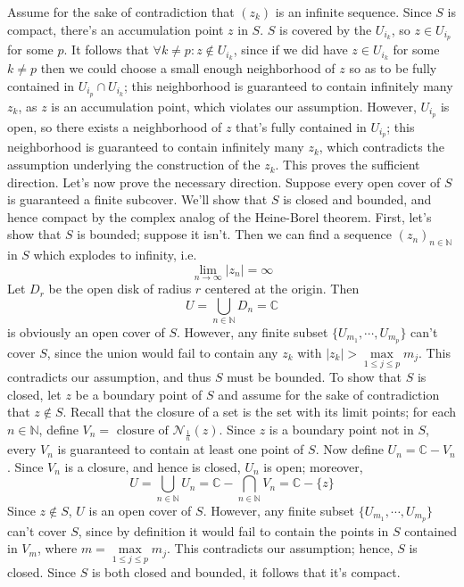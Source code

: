 \documentclass{article}
\newcommand*{\n}{\newline}
\newcommand*{\N}{\mathbb{N}}
\newcommand*{\C}{\mathbb{C}}
\begin{document}
\n
\indent Assume for the sake of contradiction that $ (z_k) $ is an infinite sequence. Since $ S $ is compact, there's an accumulation point $ z $ in $ S $. $ S $ is covered by the $ U_{i_k} $, so $ z \in U_{i_p} $ for some $ p $. It follows that $ \forall k \neq p: z \not \in U_{i_k} $, since if we did have $ z \in U_{i_k} $ for some $ k \neq p $ then we could choose a small enough neighborhood of $ z $ so as to be fully contained in $ U_{i_p} \cap U_{i_k} $; this neighborhood is guaranteed to contain infinitely many $ z_k $, as $ z $ is an accumulation point, which violates our assumption. However, $ U_{i_p} $ is open, so there exists a neighborhood of $ z $ that's fully contained in $ U_{i_p} $; this neighborhood is guaranteed to contain infinitely many $ z_k $, which contradicts the assumption underlying the construction of the $ z_k $. This proves the sufficient direction.
\n
\indent Let's now prove the necessary direction. Suppose every open cover of $ S $ is guaranteed a finite subcover. We'll show that $ S $ is closed and bounded, and hence compact by the complex analog of the Heine-Borel theorem. First, let's show that $ S $ is bounded; suppose it isn't. Then we can find a sequence $ ( z_n )_{n \in \N} $ in $ S $ which explodes to infinity, i.e.
$$ \lim_{n \to \infty} | z_n | = \infty $$
Let $ D_r $ be the open disk of radius $ r $ centered at the origin. Then
$$ U = \bigcup_{n \in \N} D_n = \C $$
is obviously an open cover of $ S $. However, any finite subset $ \{ U_{m_1}, \cdots, U_{m_p} \} $ can't cover $ S $, since the union would fail to contain any $ z_k $ with $ | z_k | > \max \limits_{1 \leq j \leq p} m_j $. This contradicts our assumption, and thus $ S $ must be bounded.
\n
To show that $ S $ is closed, let $ z $ be a boundary point of $ S $ and assume for the sake of contradiction that $ z \not \in S $. Recall that the closure of a set is the set with its limit points; for each $ n \in \N $, define $ V_n = \text{ closure of } \mathcal{N}_{\frac{1}{n}}(z) $. Since $ z $ is a boundary point not in $ S $, every $ V_n $ is guaranteed to contain at least one point of $ S $. Now define $ U_n = \C - V_n $. Since $ V_n $ is a closure, and hence is closed, $ U_n $ is open; moreover,
$$ U = \bigcup_{n \in \N} U_n = \C - \bigcap_{n \in \N} V_n = \C - \{ z \} $$
Since $ z \not \in S $, $ U $ is an open cover of $ S $. However, any finite subset $ \{ U_{m_1}, \cdots, U_{m_p} \} $ can't cover $ S $, since by definition it would fail to contain the points in $ S $ contained in $ V_m $, where $ m = \max \limits_{1 \leq j \leq p} m_j $. This contradicts our assumption; hence, $ S $ is closed.
\n
Since $ S $ is both closed and bounded, it follows that it's compact. \qedsymbol
\end{document}
